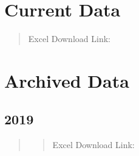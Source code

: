 \documentclass[letterpaper,10pt,english]{sphinxmanual}
\begin{document}
\section{Current Data}
\label{\detokenize{data:current-data}}\begin{quote}\begin{description}
\item[{Excel Download Link:}] \leavevmode
\sphinxAtStartPar
{}

\end{description}\end{quote}


\section{Archived Data}
\label{\detokenize{data:archived-data}}

\subsection{2019}
\label{\detokenize{data:id1}}\begin{quote}
\begin{quote}\begin{description}
\item[{Excel Download Link:}] \leavevmode
\sphinxAtStartPar
{}

\end{description}\end{quote}
\end{quote}



\renewcommand{\indexname}{Index}
\printindex
\end{document}
